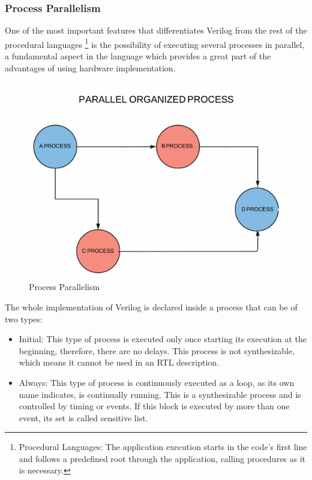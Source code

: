 \subsubsection{Process Parallelism}
One of the most important features that differentiates Verilog from the rest of the procedural languages \footnote{Procedural Languages: The application execution starts in the code’s first line and follows a predefined root through the application, calling procedures as it is necessary.} is the possibility of executing several processes in parallel, a fundamental aspect in the language which provides a great part of the advantages of using hardware implementation.

\begin{center}
	\begin{figure}[H]
		\center
		\includegraphics[trim = 0mm 0mm 0mm 0mm, clip,scale=0.3]{imagenes/EstadoArte/procesos_paralelo.pdf}
		\caption{Process Parallelism}
		\label{fig:procesos_paralelo}
	\end{figure}
	
\end{center}
The whole implementation of Verilog is declared inside a process that can be of two types:
\begin{itemize}
		\item Initial: This type of process is executed only once starting its execution at the beginning, therefore, there are no delays. This process is not synthesizable, which means it cannot be used in an RTL description.
		
		\item Always: This type of process is continuously executed as a loop, as its own name indicates, is continually running. This is a synthesizable process and is controlled by timing or events. If this block is executed by more than one event, its set is called sensitive list.
\end{itemize}

